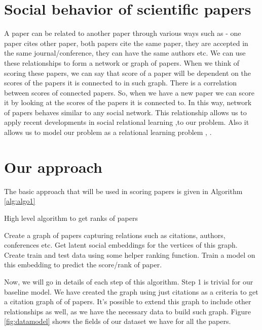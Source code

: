 \documentclass[a4paper, 11pt]{article}
\begin{document}
\section{Social behavior of scientific papers}
A paper can be related to another paper through various ways such as - one paper cites other paper, both papers cite the same paper, they are accepted in the same journal/conference, they can have the same authors etc. We can use these relationships to form a network or graph of papers. When we think of scoring these papers, we can say that score of a paper will be dependent on the scores of the papers it is connected to in such graph. There is a correlation between scores of connected papers. So, when we have a new paper we can score it by looking at the scores of the papers it is connected to. In this way, network of papers behaves similar to any social network. This relationship allows us to apply recent developments in social relational learning \cite{deepwalk}  ,\cite{tang2011leveraging}to our problem. Also it allows us to model our problem as a relational learning problem \cite{tang2009scalable}, \cite{tang2009relational}. 

\section{Our approach}
The basic approach that will be used in scoring papers is given in Algorithm \ref{alg:algo1}
\begin{algorithm}
\caption{High level algorithm to get ranks of papers}
\label{alg:algo1}
\begin{algorithmic}[1]
\State Create a graph of papers capturing relations such as citations, authors, conferences etc.
\State Get latent social embeddings for the vertices of this graph. 
\State Create train and test data using some helper ranking function.
\State Train a model on this embedding to predict the score/rank of paper.
\end{algorithmic}
\end{algorithm}
Now, we will go in details of each step of this algorithm. Step 1 is trivial for our baseline model. We have created the graph using just citations as a criteria to get a citation graph of of papers. It's possible to extend this graph to include other relationships as well, as we have the necessary data to build such graph. Figure \ref{fig:datamodel} shows the fields of our dataset we have for all the papers.
\end{document}
